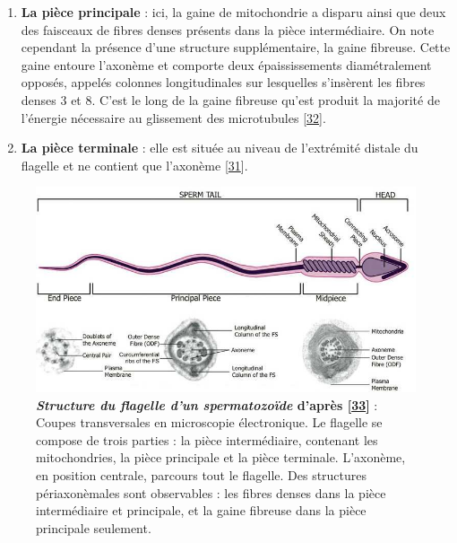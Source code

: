 \documentclass[12pt,a4paper,twoside]{ugathesis}
\providecommand{\tightlist}{%
  \setlength{\itemsep}{0pt}\setlength{\parskip}{0pt}}
\theoremstyle{definition}
\theoremstyle{definition}
\theoremstyle{definition}
\theoremstyle{remark}
\begin{document}
\newpage

\begin{enumerate}
\def\labelenumi{\arabic{enumi}.}
\setcounter{enumi}{1}
\tightlist
\item
  \textbf{La pièce principale} : ici, la gaine de mitochondrie a disparu
  ainsi que deux des faisceaux de fibres denses présents dans la pièce
  intermédiaire. On note cependant la présence d'une structure
  supplémentaire, la gaine fibreuse. Cette gaine entoure l'axonème et
  comporte deux épaississements diamétralement opposés, appelés colonnes
  longitudinales sur lesquelles s'insèrent les fibres denses 3 et 8.
  C'est le long de la gaine fibreuse qu'est produit la majorité de
  l'énergie nécessaire au glissement des microtubules
  {[}\protect\hyperlink{ref-Eddy2007}{32}{]}.\\
\item
  \textbf{La pièce terminale} : elle est située au niveau de l'extrémité
  distale du flagelle et ne contient que l'axonème
  {[}\protect\hyperlink{ref-Inaba2003}{31}{]}.
\end{enumerate}

\begin{figure}

{\centering \includegraphics[scale=.55]{figure/sperm2} 

}

\caption[Structure du flagelle d’un spermatozoïde]{\textbf{\emph{Structure du flagelle d'un spermatozoïde}
d'après {[}\protect\hyperlink{ref-Borg2010}{33}{]}} : Coupes
transversales en microscopie électronique. Le flagelle se compose de
trois parties : la pièce intermédiaire, contenant les mitochondries, la
pièce principale et la pièce terminale. L'axonème, en position centrale,
parcours tout le flagelle. Des structures périaxonèmales sont
observables : les fibres denses dans la pièce intermédiaire et
principale, et la gaine fibreuse dans la pièce principale seulement.}\label{fig:flagelle}
\end{figure}
\end{document}
